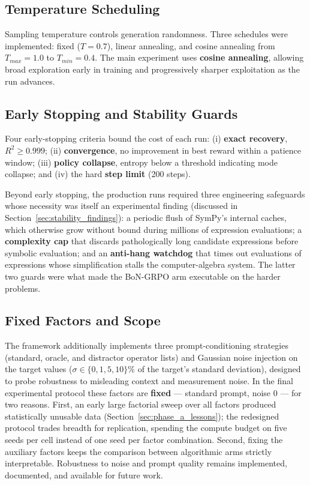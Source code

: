 \subsection{Temperature Scheduling}

Sampling temperature controls generation randomness. Three schedules were implemented: fixed ($T = 0.7$), linear annealing, and cosine annealing from $T_{max}=1.0$ to $T_{min}=0.4$. The main experiment uses \textbf{cosine annealing}, allowing broad exploration early in training and progressively sharper exploitation as the run advances.

\subsection{Early Stopping and Stability Guards}
\label{sec:guards}

Four early-stopping criteria bound the cost of each run: (i) \textbf{exact recovery}, $R^2 \geq 0.999$; (ii) \textbf{convergence}, no improvement in best reward within a patience window; (iii) \textbf{policy collapse}, entropy below a threshold indicating mode collapse; and (iv) the hard \textbf{step limit} (200 steps).

Beyond early stopping, the production runs required three engineering safeguards whose necessity was itself an experimental finding (discussed in Section~\ref{sec:stability_findings}): a periodic flush of SymPy's internal caches, which otherwise grow without bound during millions of expression evaluations; a \textbf{complexity cap} that discards pathologically long candidate expressions before symbolic evaluation; and an \textbf{anti-hang watchdog} that times out evaluations of expressions whose simplification stalls the computer-algebra system. The latter two guards were what made the BoN-GRPO arm executable on the harder problems.

\subsection{Fixed Factors and Scope}
\label{sec:fixed_factors}

The framework additionally implements three prompt-conditioning strategies (standard, oracle, and distractor operator lists) and Gaussian noise injection on the target values ($\sigma \in \{0, 1, 5, 10\}\%$ of the target's standard deviation), designed to probe robustness to misleading context and measurement noise. In the final experimental protocol these factors are \textbf{fixed} --- standard prompt, noise 0 --- for two reasons. First, an early large factorial sweep over all factors produced statistically unusable data (Section~\ref{sec:phase_a_lessons}); the redesigned protocol trades breadth for replication, spending the compute budget on five seeds per cell instead of one seed per factor combination. Second, fixing the auxiliary factors keeps the comparison between algorithmic arms strictly interpretable. Robustness to noise and prompt quality remains implemented, documented, and available for future work.


